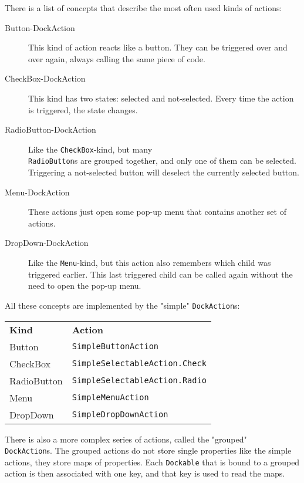 \documentclass[a4paper,10pt]{article}
\newcommand{\src}[1]{\lstinline[basicstyle=\normalsize\ttfamily,keywordstyle=\normalsize\ttfamily,identifierstyle=\normalsize\ttfamily]|#1|}
\begin{document}
There is a list of concepts that describe the most often used kinds of actions:
\begin{description}
 \item[Button-DockAction] This kind of action reacts like a button. They can be triggered over and over again, always calling the same piece of code.
 \item[CheckBox-DockAction] This kind has two states: selected and not-selected. Every time the action is triggered, the state changes.
 \item[RadioButton-DockAction] Like the \src{CheckBox}-kind, but many \\\src{RadioButton}s are grouped together, and only one of them can be selected. Triggering a not-selected button will deselect the currently selected button.
 \item[Menu-DockAction] These actions just open some pop-up menu that contains another set of actions.
 \item[DropDown-DockAction] Like the \src{Menu}-kind, but this action also remembers which child was triggered earlier. This last triggered child can be called again without the need to open the pop-up menu.
\end{description}

All these concepts are implemented by the "simple" \src{DockAction}s:
\begin{center}
\begin{tabular}{ll}
\textbf{Kind} & \textbf{Action} \\
Button & \src{SimpleButtonAction} \\
CheckBox & \src{SimpleSelectableAction.Check} \\ 
RadioButton & \src{SimpleSelectableAction.Radio} \\ 
Menu & \src{SimpleMenuAction} \\
DropDown & \src{SimpleDropDownAction}
\end{tabular}
\end{center}

There is also a more complex series of actions, called the "grouped" \\\src{DockAction}s. The grouped actions do not store single properties like the simple actions, they store maps of properties. Each \src{Dockable} that is bound to a grouped action is then associated with one key, and that key is used to read the maps.
\end{document}

